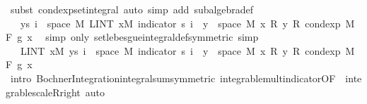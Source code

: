 \begin{isabellebody}
\ {\isacharparenleft}{\kern0pt}subst\ cond{\isacharunderscore}{\kern0pt}exp{\isacharunderscore}{\kern0pt}set{\isacharunderscore}{\kern0pt}integral{\isacharcomma}{\kern0pt}\ auto\ simp\ add{\isacharcolon}{\kern0pt}\ subalgebra{\isacharunderscore}{\kern0pt}def{\isacharparenright}{\kern0pt}\ \isanewline
\ \ \ \ \ \ \ \ \isamarkupfalse%
\ \isamarkupfalse%
\ {\isachardoublequoteopen}{\isachardot}{\kern0pt}{\isachardot}{\kern0pt}{\isachardot}{\kern0pt}\ {\isacharequal}{\kern0pt}\ {\isacharparenleft}{\kern0pt}{\isasymSum}y{\isasymin}s\ i\ {\isacharbackquote}{\kern0pt}\ space\ M{\isachardot}{\kern0pt}\ LINT\ x{\isacharbar}{\kern0pt}M{\isachardot}{\kern0pt}\ indicator\ {\isacharparenleft}{\kern0pt}s\ i\ {\isacharminus}{\kern0pt}{\isacharbackquote}{\kern0pt}\ {\isacharbraceleft}{\kern0pt}y{\isacharbraceright}{\kern0pt}\ {\isasyminter}\ space\ M{\isacharparenright}{\kern0pt}\ x\ {\isacharasterisk}{\kern0pt}\isactrlsub R\ y\ {\isacharasterisk}{\kern0pt}\isactrlsub R\ cond{\isacharunderscore}{\kern0pt}exp\ M\ F\ g\ x{\isacharparenright}{\kern0pt}{\isachardoublequoteclose}\ \isamarkupfalse%
\ {\isacharparenleft}{\kern0pt}simp\ only{\isacharcolon}{\kern0pt}\ set{\isacharunderscore}{\kern0pt}lebesgue{\isacharunderscore}{\kern0pt}integral{\isacharunderscore}{\kern0pt}def{\isacharbrackleft}{\kern0pt}symmetric{\isacharbrackright}{\kern0pt}{\isacharparenright}{\kern0pt}\ simp\isanewline
\ \ \ \ \ \ \ \ \isamarkupfalse%
\ \isamarkupfalse%
\ {\isachardoublequoteopen}{\isachardot}{\kern0pt}{\isachardot}{\kern0pt}{\isachardot}{\kern0pt}\ {\isacharequal}{\kern0pt}\ LINT\ x{\isacharbar}{\kern0pt}M{\isachardot}{\kern0pt}\ {\isacharparenleft}{\kern0pt}{\isasymSum}y{\isasymin}s\ i\ {\isacharbackquote}{\kern0pt}\ space\ M{\isachardot}{\kern0pt}\ indicator\ {\isacharparenleft}{\kern0pt}s\ i\ {\isacharminus}{\kern0pt}{\isacharbackquote}{\kern0pt}\ {\isacharbraceleft}{\kern0pt}y{\isacharbraceright}{\kern0pt}\ {\isasyminter}\ space\ M{\isacharparenright}{\kern0pt}\ x\ {\isacharasterisk}{\kern0pt}\isactrlsub R\ y\ {\isacharasterisk}{\kern0pt}\isactrlsub R\ cond{\isacharunderscore}{\kern0pt}exp\ M\ F\ g\ x{\isacharparenright}{\kern0pt}{\isachardoublequoteclose}\ \isamarkupfalse%
\ {\isacharparenleft}{\kern0pt}intro\ Bochner{\isacharunderscore}{\kern0pt}Integration{\isachardot}{\kern0pt}integral{\isacharunderscore}{\kern0pt}sum{\isacharbrackleft}{\kern0pt}symmetric{\isacharbrackright}{\kern0pt}\ integrable{\isacharunderscore}{\kern0pt}mult{\isacharunderscore}{\kern0pt}indicator{\isacharbrackleft}{\kern0pt}OF\ {\isacharunderscore}{\kern0pt}\ integrable{\isacharunderscore}{\kern0pt}scaleR{\isacharunderscore}{\kern0pt}right{\isacharbrackright}{\kern0pt}{\isacharparenright}{\kern0pt}\ auto\isanewline

\end{isabellebody}
